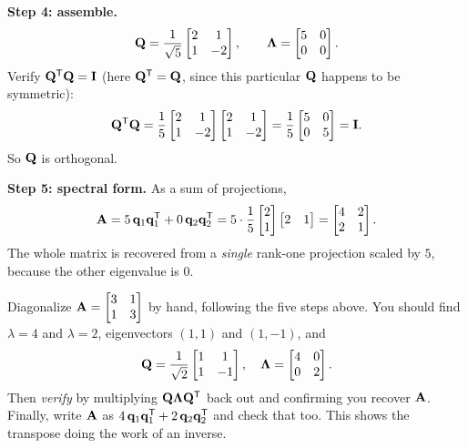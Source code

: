 \begin{example}
\textbf{Step 4: assemble.}
\[
  \mathbf{Q} = \frac{1}{\sqrt5}\begin{bmatrix} 2 & 1 \\ 1 & -2 \end{bmatrix},
  \qquad
  \mathbf{\Lambda} = \begin{bmatrix} 5 & 0 \\ 0 & 0 \end{bmatrix}.
\]
Verify $\mathbf{Q}^{\mathsf{T}}\mathbf{Q}=\mathbf{I}$ (here $\mathbf{Q}^{\mathsf{T}}=\mathbf{Q}$, since this
particular $\mathbf{Q}$ happens to be symmetric):
\[
  \mathbf{Q}^{\mathsf{T}}\mathbf{Q}
  = \frac15\begin{bmatrix}2&1\\1&-2\end{bmatrix}\begin{bmatrix}2&1\\1&-2\end{bmatrix}
  = \frac15\begin{bmatrix}5&0\\0&5\end{bmatrix}=\mathbf{I}.
\]
So $\mathbf{Q}$ is orthogonal.

\textbf{Step 5: spectral form.} As a sum of projections,
\[
  \mathbf{A} = 5\,\mathbf{q}_1\mathbf{q}_1^{\mathsf{T}} + 0\,\mathbf{q}_2\mathbf{q}_2^{\mathsf{T}}
  = 5\cdot\frac15\begin{bmatrix}2\\1\end{bmatrix}\begin{bmatrix}2&1\end{bmatrix}
  = \begin{bmatrix}4&2\\2&1\end{bmatrix}.
\]
The whole matrix is recovered from a \emph{single} rank-one projection scaled by
$5$, because the other eigenvalue is $0$.
\end{example}

\begin{labbox}
Diagonalize $\mathbf{A}=\begin{bmatrix}3&1\\1&3\end{bmatrix}$ by hand, following the
five steps above. You should find $\lambda = 4$ and $\lambda = 2$, eigenvectors
$(1,1)$ and $(1,-1)$, and
\[
  \mathbf{Q}=\frac{1}{\sqrt2}\begin{bmatrix}1&1\\1&-1\end{bmatrix},\quad
  \mathbf{\Lambda}=\begin{bmatrix}4&0\\0&2\end{bmatrix}.
\]
Then \emph{verify} by multiplying $\mathbf{Q}\mathbf{\Lambda}\mathbf{Q}^{\mathsf{T}}$ back out and
confirming you recover $\mathbf{A}$. Finally, write $\mathbf{A}$ as
$4\,\mathbf{q}_1\mathbf{q}_1^{\mathsf{T}} + 2\,\mathbf{q}_2\mathbf{q}_2^{\mathsf{T}}$ and check that too. This shows
the transpose doing the work of an inverse.
\end{labbox}

